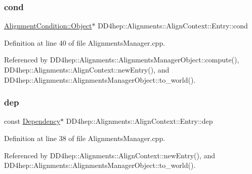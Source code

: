 \subsubsection{\texorpdfstring{cond}{cond}}
{\footnotesize\ttfamily \hyperlink{class_d_d4hep_1_1_alignments_1_1_alignment_condition_aad9d743ab04b8eb38063249c6a9e16c0}{Alignment\+Condition\+::\+Object}$\ast$ D\+D4hep\+::\+Alignments\+::\+Align\+Context\+::\+Entry\+::cond}



Definition at line 40 of file Alignments\+Manager.\+cpp.



Referenced by D\+D4hep\+::\+Alignments\+::\+Alignments\+Manager\+Object\+::compute(), D\+D4hep\+::\+Alignments\+::\+Align\+Context\+::new\+Entry(), and D\+D4hep\+::\+Alignments\+::\+Alignments\+Manager\+Object\+::to\+\_\+world().

\hypertarget{struct_d_d4hep_1_1_alignments_1_1_align_context_1_1_entry_a9e19872212429d2e48675c52c480aa35}{}\label{struct_d_d4hep_1_1_alignments_1_1_align_context_1_1_entry_a9e19872212429d2e48675c52c480aa35} 
\subsubsection{\texorpdfstring{dep}{dep}}
{\footnotesize\ttfamily const \hyperlink{namespace_d_d4hep_1_1_alignments_a94aaf200a47dbbcf42c8769eb623ea60}{Dependency}$\ast$ D\+D4hep\+::\+Alignments\+::\+Align\+Context\+::\+Entry\+::dep}



Definition at line 38 of file Alignments\+Manager.\+cpp.



Referenced by D\+D4hep\+::\+Alignments\+::\+Align\+Context\+::new\+Entry(), and D\+D4hep\+::\+Alignments\+::\+Alignments\+Manager\+Object\+::to\+\_\+world().

\hypertarget{struct_d_d4hep_1_1_alignments_1_1_align_context_1_1_entry_a746553aaf4056ce6511a17c7929dde44}{}\label{struct_d_d4hep_1_1_alignments_1_1_align_context_1_1_entry_a746553aaf4056ce6511a17c7929dde44} 
